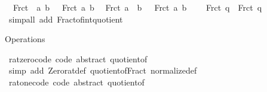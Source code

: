 \begin{isabellebody}
\ \ {\isachardoublequoteopen}Frct\ {\isacharparenleft}{\kern0pt}{\isacharminus}{\kern0pt}\ a{\isacharcomma}{\kern0pt}\ b{\isacharparenright}{\kern0pt}\ {\isacharequal}{\kern0pt}\ {\isacharminus}{\kern0pt}\ Frct\ {\isacharparenleft}{\kern0pt}a{\isacharcomma}{\kern0pt}\ b{\isacharparenright}{\kern0pt}{\isachardoublequoteclose}\isanewline
\ \ {\isachardoublequoteopen}Frct\ {\isacharparenleft}{\kern0pt}a{\isacharcomma}{\kern0pt}\ {\isacharminus}{\kern0pt}\ b{\isacharparenright}{\kern0pt}\ {\isacharequal}{\kern0pt}\ {\isacharminus}{\kern0pt}\ Frct\ {\isacharparenleft}{\kern0pt}a{\isacharcomma}{\kern0pt}\ b{\isacharparenright}{\kern0pt}{\isachardoublequoteclose}\isanewline
\ \ {\isachardoublequoteopen}{\isacharminus}{\kern0pt}\ {\isacharparenleft}{\kern0pt}{\isacharminus}{\kern0pt}\ Frct\ q{\isacharparenright}{\kern0pt}\ {\isacharequal}{\kern0pt}\ Frct\ q{\isachardoublequoteclose}\isanewline
%
\isadelimproof
\ \ %
\endisadelimproof
%
\isatagproof
{}\isamarkupfalse%
\ {\isacharparenleft}{\kern0pt}simp{\isacharunderscore}{\kern0pt}all\ add{\isacharcolon}{\kern0pt}\ Fract{\isacharunderscore}{\kern0pt}of{\isacharunderscore}{\kern0pt}int{\isacharunderscore}{\kern0pt}quotient{\isacharparenright}{\kern0pt}%
\endisatagproof
{\isafoldproof}%
%
\isadelimproof
%
\endisadelimproof
%
\begin{isamarkuptext}%
Operations%
\end{isamarkuptext}\isamarkuptrue%
\isamarkupfalse%
\ rat{\isacharunderscore}{\kern0pt}zero{\isacharunderscore}{\kern0pt}code\ {\isacharbrackleft}{\kern0pt}code\ abstract{\isacharbrackright}{\kern0pt}{\isacharcolon}{\kern0pt}\ {\isachardoublequoteopen}quotient{\isacharunderscore}{\kern0pt}of\ {}\ {\isacharequal}{\kern0pt}\ {\isacharparenleft}{\kern0pt}{}{\isacharcomma}{\kern0pt}\ {}{\isacharparenright}{\kern0pt}{\isachardoublequoteclose}\isanewline
%
\isadelimproof
\ \ %
\endisadelimproof
%
\isatagproof
{}\isamarkupfalse%
\ {\isacharparenleft}{\kern0pt}simp\ add{\isacharcolon}{\kern0pt}\ Zero{\isacharunderscore}{\kern0pt}rat{\isacharunderscore}{\kern0pt}def\ quotient{\isacharunderscore}{\kern0pt}of{\isacharunderscore}{\kern0pt}Fract\ normalize{\isacharunderscore}{\kern0pt}def{\isacharparenright}{\kern0pt}%
\endisatagproof
{\isafoldproof}%
%
\isadelimproof
\isanewline
%
\endisadelimproof
\isanewline
{}\isamarkupfalse%
\ rat{\isacharunderscore}{\kern0pt}one{\isacharunderscore}{\kern0pt}code\ {\isacharbrackleft}{\kern0pt}code\ abstract{\isacharbrackright}{\kern0pt}{\isacharcolon}{\kern0pt}\ {\isachardoublequoteopen}quotient{\isacharunderscore}{\kern0pt}of\ {}\ {\isacharequal}{\kern0pt}\ {\isacharparenleft}{\kern0pt}{}{\isacharcomma}{\kern0pt}\ {}{\isacharparenright}{\kern0pt}{\isachardoublequoteclose}\isanewline

\end{isabellebody}
